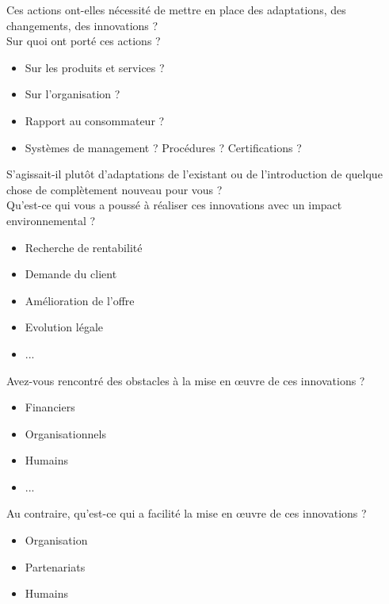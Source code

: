 Ces actions ont-elles nécessité de mettre en place des adaptations, des changements, des innovations ? \\

Sur quoi ont porté ces actions ? 
    \begin{itemize}
        \item Sur les produits et services ?
        \item Sur l’organisation ? 
        \item Rapport au consommateur ?  
        \item Systèmes de management ? Procédures ? Certifications ?  \\
    \end{itemize}


S’agissait-il plutôt d’adaptations de l’existant ou de l’introduction de quelque chose de complètement nouveau pour vous ? \\

Qu’est-ce qui vous a poussé à réaliser ces innovations avec un impact environnemental ? 
    \begin{itemize}
        \item Recherche de rentabilité
        \item Demande du client 
        \item Amélioration de l’offre
        \item Evolution légale 
        \item ... \\
    \end{itemize}

Avez-vous rencontré des obstacles à la mise en œuvre de ces innovations ? 
    \begin{itemize}
        \item Financiers
        \item Organisationnels
        \item Humains
        \item ... \\
    \end{itemize}
    
Au contraire, qu’est-ce qui a facilité la mise en œuvre de ces innovations ? 
    \begin{itemize}
        \item Organisation
        \item Partenariats
        \item Humains \\
    \end{itemize}

